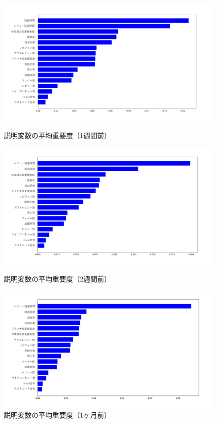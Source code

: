 \documentclass[submit,ses,noauthor]{ipsj}
\begin{document}
\begin{figure}[t]
  \centering
  \includegraphics[width=0.5\linewidth]{./fig/one_week_bar.pdf}
  \caption{説明変数の平均重要度（1週間前）}
  \label{fig:one_week_bar}

  \centering
  \includegraphics[width=1.0\linewidth]{fig/two_weeks_bar.pdf}
  \caption{説明変数の平均重要度（2週間前）}
  \label{fig:two_weeks_bar}

  \centering
  \includegraphics[width=1.0\linewidth]{fig/one_month_bar.pdf}
  \caption{説明変数の平均重要度（1ヶ月前）}
  \label{fig:one_month_bar}


\end{figure}
\end{document}
